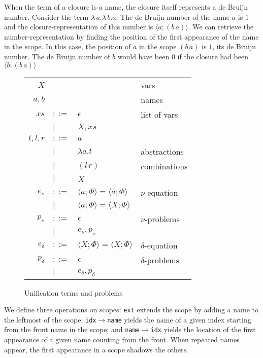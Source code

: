 \documentclass[a4paper,UKenglish]{lipics-v2016}
\newcommand{\clos}[2] {
\langle #1; #2 \rangle
}
\newcommand{\app}[2] {
(#1\, #2)
}
\begin{document}
When the term of a closure is a name, the closure itself represents a
de Bruijn number. Consider the term
$\lambda\,a.\lambda\,b.a$. The de Bruijn number of the name $a$ is $1$
and the closure-representation of this number is $\clos{a}{(b\,a)}$.
We can retrieve the number-representation by finding the position of
the first appearance of the name in the scope. In this case, the
position of $a$ in the scope $(b\,a)$ is $1$, its de Bruijn
number. The de Bruijn number of $b$ would have been $0$
if the closure had been $\clos{b}{(b\,a)}$

\begin{wrapfigure}{r}{0.5\textwidth}
\caption{Unification terms and problems\label{table:new-terms}}
\begin{tabular}{r l l l}
$X$ & & & vars \\
$a,b$ & & & names \\
$xs$ & $::=$ & $\epsilon$& list of vars \\
& $|$&$X,xs$ &\\
$t,l,r$ & $::=$ & $a$ & \\
& $|$ & $\lambda a.t$ & abstractions \\
& $|$ & $\app{l}{r}$ & combinations \\
& $|$ & $X$ & \\
$e_\nu$& $::=$ & $\clos{a}{\Phi} = \clos{a}{\Phi}$ & $\nu$-equation \\
 & $|$ &$\clos{a}{\Phi} = \clos{X}{\Phi}$ \\
$p_\nu$& $::=$ & $\epsilon$ & $\nu$-problems \\
 & $|$ & $e_\nu, p_\nu$ \\
$e_\delta$& $::=$& $\clos{X}{\Phi} = \clos{X}{\Phi}$ & $\delta$-equation \\
$p_\delta$& $::=$ & $\epsilon$ & $\delta$-problems \\
 & $|$ & $e_\delta, p_\delta$
\end{tabular}
\end{wrapfigure}

We define three operations on scopes: \texttt{ext}
extends the scope by adding a name to the leftmost of the scope;
\texttt{idx$\rightarrow$name} yields the name of a given index
starting from the front name in the scope; and
\texttt{name$\rightarrow$idx} yields the location of the first
appearance of a given name counting from the front.
When repeated names appear, the
first appearance in a scope shadows the others.
\end{document}
